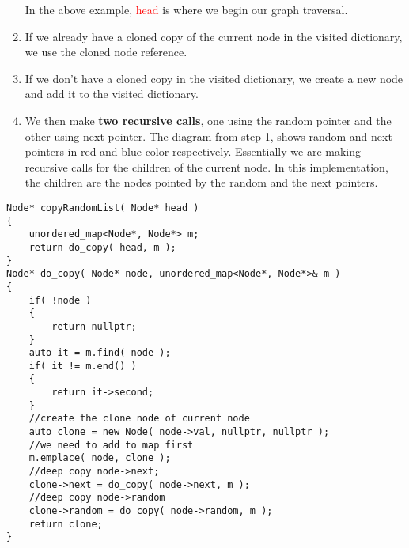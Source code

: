 \begin{enumerate}
\begin{figure}[H]
\end{figure}
    In the above example, \textcolor{red}{head} is where we begin our graph traversal.
    \item If we already have a cloned copy of the current node in the visited dictionary, we use the cloned node reference.
    \item If we don't have a cloned copy in the visited dictionary, we create a new node and add it to the visited dictionary.
    \item We then make \textbf{two recursive calls}, one using the random pointer and the other using next pointer. The diagram from step 1, shows random and next pointers in red and blue color respectively. Essentially we are making recursive calls for the children of the current node. In this implementation, the children are the nodes pointed by the random and the next pointers.
\end{enumerate}

\setcounter{lstlisting}{0}
\begin{lstlisting}[style=customc, caption={DFS}]
Node* copyRandomList( Node* head )
{
    unordered_map<Node*, Node*> m;
    return do_copy( head, m );
}
Node* do_copy( Node* node, unordered_map<Node*, Node*>& m )
{
    if( !node )
    {
        return nullptr;
    }
    auto it = m.find( node );
    if( it != m.end() )
    {
        return it->second;
    }
    //create the clone node of current node
    auto clone = new Node( node->val, nullptr, nullptr );
    //we need to add to map first
    m.emplace( node, clone );
    //deep copy node->next;
    clone->next = do_copy( node->next, m );
    //deep copy node->random
    clone->random = do_copy( node->random, m );
    return clone;
}
\end{lstlisting}


